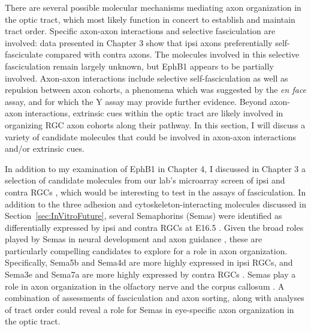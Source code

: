 There are several possible molecular mechanisms mediating axon organization in the optic tract, which most likely function in concert to establish and maintain tract order.
Specific axon-axon interactions and selective fasciculation are involved: data presented in Chapter 3 show that ipsi axons preferentially self-fasciculate compared with contra axons.
The molecules involved in this selective fasciculation remain largely unknown, but EphB1 appears to be partially involved.
Axon-axon interactions include selective self-fasciculation as well as repulsion between axon cohorts, a phenomena which was suggested by the \emph{en face} assay, and for which the Y assay may provide further evidence.
Beyond axon-axon interactions, extrinsic cues within the optic tract are likely involved in organizing RGC axon cohorts along their pathway.
In this section, I will discuss a variety of candidate molecules that could be involved in axon-axon interactions and/or extrinsic cues.

In addition to my examination of EphB1 in Chapter 4, I discussed in Chapter 3 a selection of candidate molecules from our lab's microarray screen of ipsi and contra RGCs \cite{wang2016ipsilateral}, which would be interesting to test in the \invitro{} assays of fasciculation.
In addition to the three adhesion and cytoskeleton-interacting molecules discussed in Section~\ref{sec:InVitroFuture}, several Semaphorins (Semas) were identified as differentially expressed by ipsi and contra RGCs at E16.5 \cite{wang2016ipsilateral}.
Given the broad roles played by Semas in neural development and axon guidance \cite{raper2000semaphorins}, these are particularly compelling candidates to explore for a role in axon organization.
Specifically, Sema5b and Sema4d are more highly expressed in ipsi RGCs, and Sema3e and Sema7a are more highly expressed by contra RGCs \cite{wang2016ipsilateral}.
Semas play a role in axon organization in the olfactory nerve \cite{imai2009pre} and the corpus callosum \cite{zhou2013axon}.
A combination of \invitro{} assessments of fasciculation and axon sorting, along with \invivo{} analyses of tract order could reveal a role for Semas in eye-specific axon organization in the optic tract.

